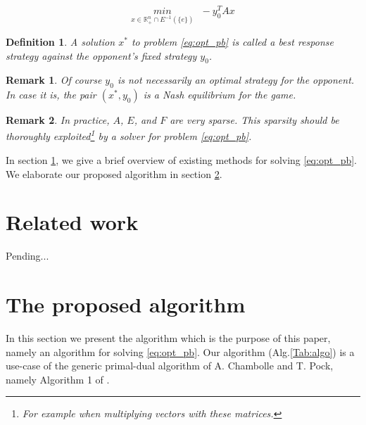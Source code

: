 \documentclass[a4paper,9pt,journal]{IEEEtran}
\newtheorem{remark}{Remark}
\newtheorem{definition}[theorem]{Definition}
\begin{document}
\begin{equation}
  \underset{x \in \mathbb{R}_{+}^n \cap E^{-1}(\{e\})}{min}\text{ }-y_0^TAx
  \label{eq:opt_pb}
\end{equation}

\begin{definition}
A solution $x^*$ to problem \eqref{eq:opt_pb} is called a \textit{best response} strategy against
the opponent's fixed strategy $y_0$.
\end{definition}

\begin{remark}
Of course $y_0$ is not necessarily an optimal strategy for the opponent. In case it is, the pair $(x^*, y_0)$
is a Nash equilibrium for the game.
\end{remark}

\begin{remark}
  In practice, $A$, $E$, and $F$ are very sparse.
This sparsity should be thoroughly exploited\footnote{For example when
multiplying vectors with these matrices.} by a solver for problem \eqref{eq:opt_pb}.
\end{remark}

In section \ref{sec:related_work}, we give a brief overview of existing methods for solving \eqref{eq:opt_pb}.
We elaborate our proposed algorithm in section \ref{sec:algo}.

\section{Related work}
\label{sec:related_work}

Pending...

\section{The proposed algorithm}
\label{sec:algo}
In this section we present the algorithm which is the purpose of this paper, namely an algorithm
for solving \eqref{eq:opt_pb}. Our algorithm (Alg.\ref{Tab:algo}) is a use-case of
the generic primal-dual algorithm of A. Chambolle and T. Pock, namely Algorithm 1 of \cite{chambolle2010}.
\end{document}
